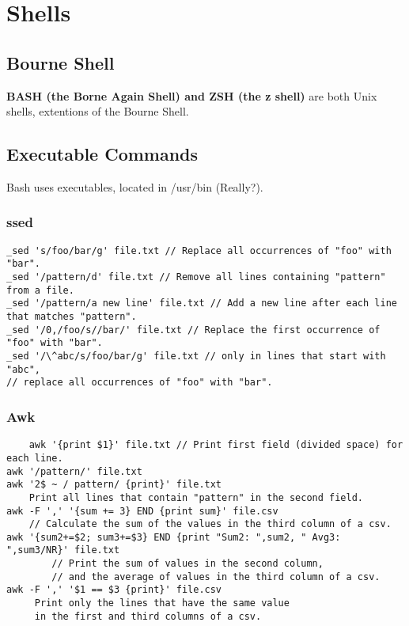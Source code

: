 
\chapter{Shells}

\section{Bourne Shell}

\textbf{BASH (the Borne Again Shell) and ZSH (the z shell)} are both Unix shells, extentions of the Bourne Shell.

\section{Executable Commands}

Bash uses executables, located in /usr/bin (Really?).

\subsection{ssed}

\begin{verbatim}
_sed 's/foo/bar/g' file.txt // Replace all occurrences of "foo" with "bar".
_sed '/pattern/d' file.txt // Remove all lines containing "pattern" from a file.
_sed '/pattern/a new line' file.txt // Add a new line after each line that matches "pattern".
_sed '/0,/foo/s//bar/' file.txt // Replace the first occurrence of "foo" with "bar".
_sed '/\^abc/s/foo/bar/g' file.txt // only in lines that start with "abc", 
// replace all occurrences of "foo" with "bar".
\end{verbatim}

\subsection{Awk}

\begin{verbatim}
    awk '{print $1}' file.txt // Print first field (divided space) for each line.
awk '/pattern/' file.txt
awk '2$ ~ / pattern/ {print}' file.txt 
    Print all lines that contain "pattern" in the second field.
awk -F ',' '{sum += 3} END {print sum}' file.csv 
    // Calculate the sum of the values in the third column of a csv.
awk '{sum2+=$2; sum3+=$3} END {print "Sum2: ",sum2, " Avg3: ",sum3/NR}' file.txt
        // Print the sum of values in the second column,
        // and the average of values in the third column of a csv.
awk -F ',' '$1 == $3 {print}' file.csv 
     Print only the lines that have the same value
     in the first and third columns of a csv.
\end{verbatim}

